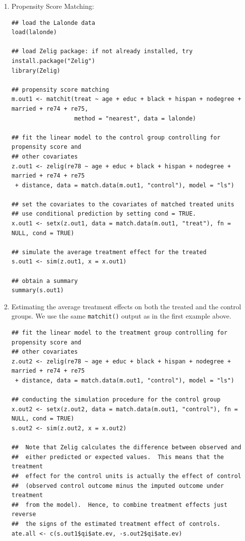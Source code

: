\documentclass[oneside,letterpaper,titlepage]{article}
\begin{document}
\begin{enumerate}
\item Propensity Score Matching: 
\begin{verbatim}
## load the Lalonde data
load(lalonde)

## load Zelig package: if not already installed, try install.package("Zelig")
library(Zelig)

## propensity score matching
m.out1 <- matchit(treat ~ age + educ + black + hispan + nodegree + married + re74 + re75, 
                  method = "nearest", data = lalonde)

## fit the linear model to the control group controlling for propensity score and 
## other covariates
z.out1 <- zelig(re78 ~ age + educ + black + hispan + nodegree + married + re74 + re75
 + distance, data = match.data(m.out1, "control"), model = "ls")

## set the covariates to the covariates of matched treated units
## use conditional prediction by setting cond = TRUE.
x.out1 <- setx(z.out1, data = match.data(m.out1, "treat"), fn = NULL, cond = TRUE)

## simulate the average treatment effect for the treated
s.out1 <- sim(z.out1, x = x.out1)

## obtain a summary
summary(s.out1)
\end{verbatim}
  
\item Estimating the average treatment effects on both the treated and
  the control groups. We use the same {\tt matchit()} output as in the
  first example above.
\begin{verbatim}
## fit the linear model to the treatment group controlling for propensity score and 
## other covariates
z.out2 <- zelig(re78 ~ age + educ + black + hispan + nodegree + married + re74 + re75
 + distance, data = match.data(m.out1, "control"), model = "ls")

## conducting the simulation procedure for the control group
x.out2 <- setx(z.out2, data = match.data(m.out1, "control"), fn = NULL, cond = TRUE)
s.out2 <- sim(z.out2, x = x.out2)

##  Note that Zelig calculates the difference between observed and
##  either predicted or expected values.  This means that the treatment
##  effect for the control units is actually the effect of control
##  (observed control outcome minus the imputed outcome under treatment
##  from the model).  Hence, to combine treatment effects just reverse
##  the signs of the estimated treatment effect of controls.
ate.all <- c(s.out1$qi$ate.ev, -s.out2$qi$ate.ev)


\end{verbatim}
\end{enumerate}
\end{document}
